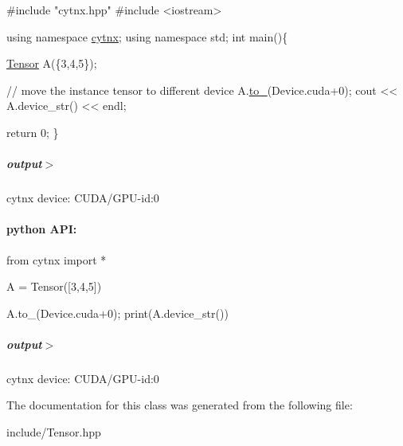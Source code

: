 \begin{DoxyCodeInclude}
\textcolor{preprocessor}{#include "cytnx.hpp"}
\textcolor{preprocessor}{#include <iostream>}


\textcolor{keyword}{using namespace }\hyperlink{namespacecytnx}{cytnx};
\textcolor{keyword}{using namespace }std;
\textcolor{keywordtype}{int} main()\{

    \hyperlink{classcytnx_1_1Tensor}{Tensor} A(\{3,4,5\});

    \textcolor{comment}{// move the instance tensor to different device}
    A.\hyperlink{classcytnx_1_1Tensor_a114a31fbb8bf4a90f150b6a67e42183a}{to\_}(Device.cuda+0);
    cout << A.device\_str() << endl;

    \textcolor{keywordflow}{return} 0;
\}
\end{DoxyCodeInclude}
 \subparagraph*{output$>$}


\begin{DoxyVerbInclude}
cytnx device: CUDA/GPU-id:0
\end{DoxyVerbInclude}
 \paragraph*{python A\+PI\+:}


\begin{DoxyCodeInclude}
\textcolor{keyword}{from} cytnx \textcolor{keyword}{import} *

A = Tensor([3,4,5])

A.to\_(Device.cuda+0);
print(A.device\_str())

\end{DoxyCodeInclude}
 \subparagraph*{output$>$}


\begin{DoxyVerbInclude}
cytnx device: CUDA/GPU-id:0
\end{DoxyVerbInclude}
 

The documentation for this class was generated from the following file\+:\begin{DoxyCompactItemize}
\item 
include/Tensor.\+hpp\end{DoxyCompactItemize}
